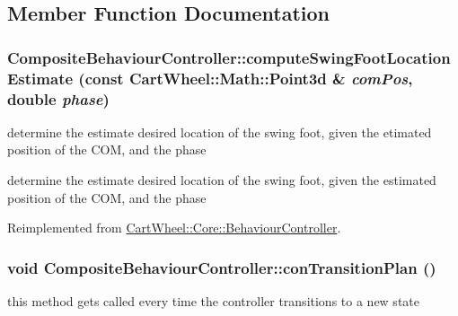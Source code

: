 \subsection{Member Function Documentation}
\hypertarget{classCartWheel_1_1Core_1_1CompositeBehaviourController_a956bb427f158690080f381bd9cf4a089}{
\subsubsection[{computeSwingFootLocationEstimate}]{ CompositeBehaviourController::computeSwingFootLocationEstimate (const {\bf CartWheel::Math::Point3d} \& {\em comPos}, \/  double {\em phase})}}
\label{classCartWheel_1_1Core_1_1CompositeBehaviourController_a956bb427f158690080f381bd9cf4a089}
determine the estimate desired location of the swing foot, given the etimated position of the COM, and the phase

determine the estimate desired location of the swing foot, given the estimated position of the COM, and the phase 

Reimplemented from \hyperlink{classCartWheel_1_1Core_1_1BehaviourController_a4586a96ada87681f596ab6bd67af4144}{CartWheel::Core::BehaviourController}.

\hypertarget{classCartWheel_1_1Core_1_1CompositeBehaviourController_a7fd8f2e351f4dd0fff087c8d254b998e}{
\subsubsection[{conTransitionPlan}]{\setlength{\rightskip}{0pt plus 5cm}void CompositeBehaviourController::conTransitionPlan ()}}
\label{classCartWheel_1_1Core_1_1CompositeBehaviourController_a7fd8f2e351f4dd0fff087c8d254b998e}
this method gets called every time the controller transitions to a new state 

